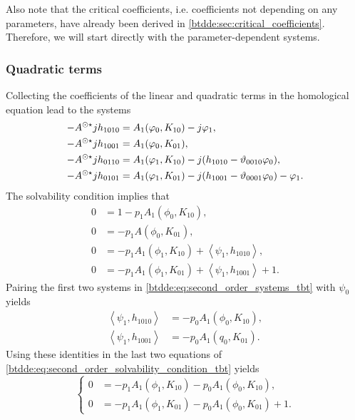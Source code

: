 Also note that the critical coefficients, i.e. coefficients not depending on any
parameters, have already been derived in \cref{btdde:sec:critical_coefficients}.
Therefore, we will start directly with the parameter-dependent systems.

\subsubsection{Quadratic terms}

Collecting the coefficients of the linear and quadratic terms in the
homological equation lead to the systems
\begin{equation}
\begin{aligned}
\label{btdde:eq:second_order_systems_tbt}
-A^{\odot\star} jh_{1010} & = A_1(\varphi_0,K_{10})-j\varphi_1, \\
-A^{\odot\star} jh_{1001} & = A_1(\varphi_0,K_{01}), \\
-A^{\odot\star} jh_{0110} & = A_1(\varphi_1,K_{10}) - j(h_{1010} - \vartheta_{0010}\varphi_0), \\
-A^{\odot\star} jh_{0101} & = A_1(\varphi_1,K_{01}) - j(h_{1001} - \vartheta_{0001}\varphi_0)  - \varphi_1.
\end{aligned}
\end{equation}
The solvability condition implies that
\begin{equation}
\begin{aligned}
\label{btdde:eq:second_order_solvability_condition_tbt}
0 & = 1-p_1 A_1(\phi_0,K_{10}), \\
0 & = -p_1 A(\phi_0,K_{01}), \\
0 & = -p_1 A_1(\phi_1,K_{10}) + \left< \psi_1,h_{1010}\right>, \\
0 & = -p_1 A_1(\phi_1,K_{01}) + \left< \psi_1,h_{1001}\right> + 1.
\end{aligned}
\end{equation}
Pairing the first two systems in \cref{btdde:eq:second_order_systems_tbt}
with $\psi_0$ yields
\begin{align*}
\left< \psi_1,h_{1010} \right>  & = -p_0A_1(\phi_0,K_{10}),\\
\left< \psi_1,h_{1001} \right>  & = -p_0A_1(q_0,K_{01}).
\end{align*}
Using these identities in the last two equations of
\cref{btdde:eq:second_order_solvability_condition_tbt} yields
\begin{equation}
\label{btdde:eq:tbt_k_system}
\begin{cases}
0 & = -p_1A_1(\phi_1,K_{10})-p_0A_1(\phi_0,K_{10}),\\
0 & = -p_1A_1(\phi_1,K_{01})-p_0A_1(\phi_0,K_{01}) + 1.
\end{cases}
\end{equation}

